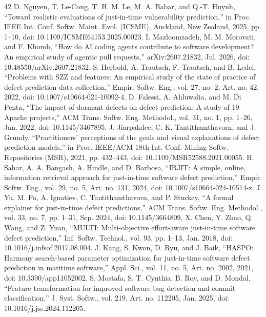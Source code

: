 \begin{thebibliography}{42}
 D. Nguyen, T. Le-Cong, T. H. M. Le, M. A. Babar, and Q.-T. Huynh, ``Toward realistic evaluations of just-in-time vulnerability prediction,'' in Proc. IEEE Int. Conf. Softw. Maint. Evol. (ICSME), Auckland, New Zealand, 2025, pp. 1--10, doi: \mbox{10.1109/ICSME64153.2025.00023}.
 I. Mazloomzadeh, M. M. Morovati, and F. Khomh, ``How do AI coding agents contribute to software development? An empirical study of agentic pull requests,'' arXiv:2607.21832, Jul. 2026, doi: \mbox{10.48550/arXiv.2607.21832}.
 S. Herbold, A. Trautsch, F. Trautsch, and B. Ledel, ``Problems with SZZ and features: An empirical study of the state of practice of defect prediction data collection,'' Empir. Softw. Eng., vol. 27, no. 2, Art. no. 42, 2022, doi: \mbox{10.1007/s10664-021-10092-4}.
 D. Falessi, A. Ahluwalia, and M. Di Penta, ``The impact of dormant defects on defect prediction: A study of 19 Apache projects,'' ACM Trans. Softw. Eng. Methodol., vol. 31, no. 1, pp. 1--26, Jan. 2022, doi: \mbox{10.1145/3467895}.
 J. Jiarpakdee, C. K. Tantithamthavorn, and J. Grundy, ``Practitioners' perceptions of the goals and visual explanations of defect prediction models,'' in Proc. IEEE/ACM 18th Int. Conf. Mining Softw. Repositories (MSR), 2021, pp. 432--443, doi: \mbox{10.1109/MSR52588.2021.00055}.
 H. Sahar, A. A. Bangash, A. Hindle, and D. Barbosa, ``IRJIT: A simple, online, information retrieval approach for just-in-time software defect prediction,'' Empir. Softw. Eng., vol. 29, no. 5, Art. no. 131, 2024, doi: \mbox{10.1007/s10664-024-10514-z}.
 J. Yu, M. Fu, A. Ignatiev, C. Tantithamthavorn, and P. Stuckey, ``A formal explainer for just-in-time defect predictions,'' ACM Trans. Softw. Eng. Methodol., vol. 33, no. 7, pp. 1--31, Sep. 2024, doi: \mbox{10.1145/3664809}.
 X. Chen, Y. Zhao, Q. Wang, and Z. Yuan, ``MULTI: Multi-objective effort-aware just-in-time software defect prediction,'' Inf. Softw. Technol., vol. 93, pp. 1--13, Jan. 2018, doi: \mbox{10.1016/j.infsof.2017.08.004}.
 J. Kang, S. Kwon, D. Ryu, and J. Baik, ``HASPO: Harmony search-based parameter optimization for just-in-time software defect prediction in maritime software,'' Appl. Sci., vol. 11, no. 5, Art. no. 2002, 2021, doi: \mbox{10.3390/app11052002}.
 S. Mostafa, S. T. Cynthia, B. Roy, and D. Mondal, ``Feature transformation for improved software bug detection and commit classification,'' J. Syst. Softw., vol. 219, Art. no. 112205, Jan. 2025, doi: \mbox{10.1016/j.jss.2024.112205}.

\end{thebibliography}
